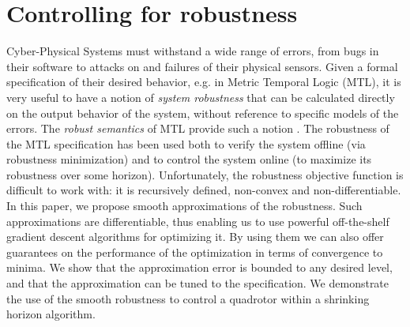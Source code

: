 \section{Controlling for robustness}
\label{sec:intro}
Cyber-Physical Systems must withstand a wide range of errors, from bugs in their software to attacks on and failures of their physical sensors.
Given a formal specification of their desired behavior, e.g. in Metric Temporal Logic (MTL), it is very useful to have a notion of \textit{system robustness} that can be calculated directly on the output behavior of the system, without reference to specific models of the errors.
The \textit{robust semantics} of MTL provide such a notion \cite{FainekosGP06formats}.
The robustness of the MTL specification has been used both to verify the system offline (via robustness minimization) and to control the system online (to maximize its robustness over some horizon).
Unfortunately, the robustness objective function is difficult to work with: it is recursively defined, non-convex and non-differentiable.
In this paper, we propose smooth approximations of the robustness. 
Such approximations are differentiable, thus enabling us to use powerful off-the-shelf gradient descent algorithms for optimizing it.
By using them we can also offer guarantees on the performance of the optimization in terms of convergence to minima.
We show that the approximation error is bounded to any desired level, and that the approximation can be tuned to the specification.
We demonstrate the use of the smooth robustness to control a quadrotor within a shrinking horizon algorithm. 


